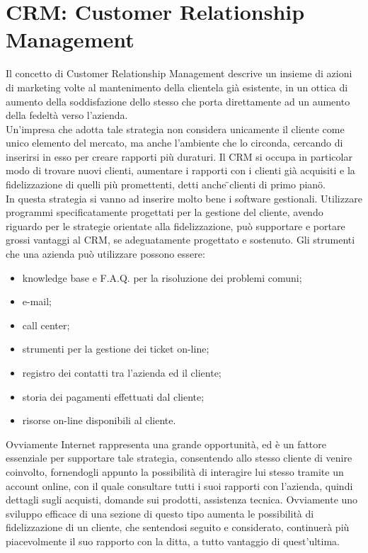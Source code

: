 \section{CRM: Customer Relationship Management}
Il concetto di Customer Relationship Management descrive un insieme di azioni di marketing volte al mantenimento della clientela gi\` a esistente, in un ottica di aumento della soddisfazione dello stesso che porta direttamente ad un aumento della fedelt\` a verso l'azienda.  \\
Un'impresa che adotta tale strategia non considera unicamente il cliente come unico elemento del mercato, ma anche l'ambiente che lo circonda, cercando di inserirsi in esso per creare rapporti pi\` u duraturi. Il CRM si occupa in particolar modo di trovare nuovi clienti, aumentare i rapporti con i clienti gi\`a  acquisiti e la fidelizzazione di quelli pi\` u promettenti, detti anche \"{}clienti di primo piano\"{}.  \\
In questa strategia si vanno ad inserire molto bene i software gestionali. Utilizzare programmi specificatamente progettati per la gestione del cliente, avendo riguardo per le strategie orientate alla fidelizzazione, pu\` o supportare e portare grossi vantaggi al CRM, se adeguatamente progettato e sostenuto. Gli strumenti che una azienda pu\` o utilizzare possono essere: 
  \begin{itemize}
    \item  knowledge base e F.A.Q. per la risoluzione dei problemi comuni;
    \item  e-mail;
    \item  call center;
    \item  strumenti per la gestione dei ticket on-line;
    \item  registro dei contatti tra l'azienda ed il cliente;
    \item  storia dei pagamenti effettuati dal cliente;
    \item  risorse on-line disponibili al cliente.
  \end{itemize}
\noindent
Ovviamente Internet rappresenta una grande opportunit\`a, ed \`e un fattore essenziale per supportare tale strategia, consentendo allo stesso cliente di venire coinvolto, fornendogli appunto la possibilit\`a di interagire lui stesso tramite un account online, con il quale consultare tutti i suoi rapporti con l'azienda, quindi dettagli sugli acquisti, domande sui prodotti, assistenza tecnica. Ovviamente uno sviluppo efficace di una sezione di questo tipo aumenta le possibilit\`a di fidelizzazione di un cliente, che sentendosi seguito e considerato, continuer\`a pi\`u piacevolmente il suo rapporto con la ditta, a tutto vantaggio di quest'ultima. 

